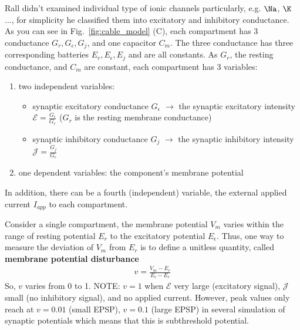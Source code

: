 Rall didn't examined individual type of ionic channels particularly,
e.g. $\Na$, $\K$..., for simplicity he classified them into
excitatory and inhibitory conductance.  As you can see in
Fig.~\ref{fig:cable_model} (C), each compartment has 3 conductance
$G_r,G_\epsilon, G_j$, and one capacitor $C_m$. The three conductance
has three corresponding batteries $E_r, E_\epsilon, E_j$ and are all
constants. As $G_r$, the resting conductance, and $C_m$ are constant,
each compartment has 3 variables:
\begin{enumerate}
\item two independent variables:
  \begin{itemize}
  \item synaptic excitatory conductance $G_\epsilon$ $\rightarrow$ the
    synaptic excitatory intensity $\mathcal{E} =
    \frac{G_\epsilon}{G_r}$ ($G_r$ is the resting membrane
    conductance)
  \item synaptic inhibitory conductance $G_j$ $\rightarrow$ the
    synaptic inhibitory intensity $\mathcal{J} = \frac{G_j}{G_r}$
\end{itemize}

\item one dependent variables: the component's membrane potential
\end{enumerate}
In addition, there can be a fourth (independent) variable, the
external applied current $I_{app}$ to each compartment. 

Consider a single compartment, the membrane potential $V_m$ varies
within the range of resting potential $E_r$ to the excitatory
potential $E_\epsilon$. Thus, one way to measure the deviation of
$V_m$ from $E_r$ is to define a unitless quantity, called
{\bf membrane potential disturbance}
\begin{eqnarray}
  \label{eq:404}
  v = \frac{V_m-E_r}{E_\epsilon - E_r}
\end{eqnarray}
So, $v$ varies from 0 to 1. NOTE: $v=1$ when $\mathcal{E}$ very large
(excitatory signal), $\mathcal{J}$ small (no inhibitory signal), and
no applied current. However, peak values only reach at $v=0.01$ (small
EPSP), $v=0.1$ (large EPSP) in several simulation of synaptic
potentials which means that this is subthreshold potential.

